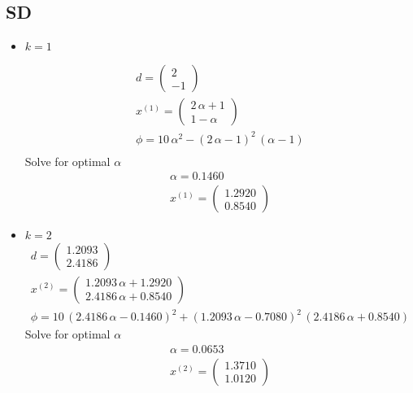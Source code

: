 \subsection{SD}
\begin{itemize}
\item $k = 1$ \par 
\begin{gather*}
d = \begin{pmatrix} 2 \\ -1\end{pmatrix}\\
x^{(1)} = \left(\begin{array}{c}
2\,\alpha +1\\
1-\alpha 
\end{array}\right)\\
\phi = 10\,\alpha^2 -{{\left(2\,\alpha -1\right)}}^2 \,{\left(\alpha -1\right)} \\
\end{gather*}
Solve for optimal $\alpha$ 
\begin{gather*}
\alpha = 0.1460 \\
x^{(1)} = \left(\begin{array}{c}
1.2920\\
0.8540
\end{array}\right)
\end{gather*}
\item $k = 2$
\begin{gather*}
d = \left(\begin{array}{c}
1.2093\\
2.4186
\end{array}\right)\\
x^{(2)} = \left(\begin{array}{c}
1.2093\,\alpha +1.2920\\
2.4186\,\alpha +0.8540
\end{array}\right)\\
\phi = 10\,{{\left(2.4186\,\alpha -0.1460\right)}}^2 +{{\left(1.2093\,\alpha -0.7080\right)}}^2 \,{\left(2.4186\,\alpha +0.8540\right)}
\end{gather*}
Solve for optimal $\alpha$
\begin{gather*}
\alpha = 0.0653 \\
x^{(2)} = \left(\begin{array}{c}
1.3710\\
1.0120
\end{array}\right)
\end{gather*}
\end{itemize}

